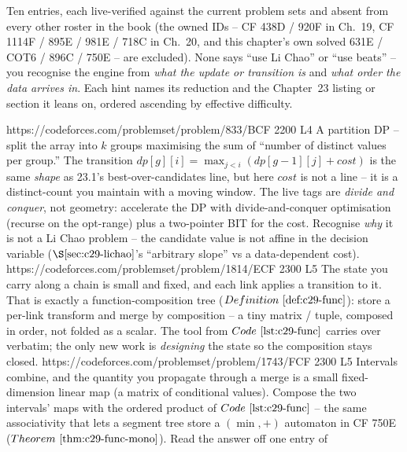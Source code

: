 
Ten entries, each live-verified against the current problem sets and absent from every other roster
in the book (the owned IDs -- CF 438D / 920F in Ch.~19, CF 1114F / 895E / 981E / 718C in Ch.~20, and
this chapter's own solved 631E / COT6 / 896C / 750E -- are excluded). None says ``use Li Chao'' or
``use beats'' -- you recognise the engine from \emph{what the update or transition is} and \emph{what
order the data arrives in}. Each hint names its reduction and the Chapter~23 listing or section it
leans on, ordered ascending by effective difficulty.

\begin{mixedset}
    {https://codeforces.com/problemset/problem/833/B}{CF 2200 L4}
    {A partition DP -- split the array into \(k\) groups maximising the sum of ``number of distinct
     values per group.'' The transition \(\mathit{dp}[g][i]=\max_{j<i}(\mathit{dp}[g{-}1][j]+\mathit{cost})\)
     is the same \emph{shape} as 23.1's best-over-candidates line, but here \(\mathit{cost}\) is not a
     line -- it is a distinct-count you maintain with a moving window. The live tags are \emph{divide
     and conquer}, not geometry: accelerate the DP with divide-and-conquer optimisation (recurse on the
     opt-range) plus a two-pointer BIT for the cost. Recognise \emph{why} it is not a Li Chao problem --
     the candidate value is not affine in the decision variable (\(\secref{c29-lichao}\)'s ``arbitrary
     slope'' vs a data-dependent cost).}
    {https://codeforces.com/problemset/problem/1814/E}{CF 2300 L5}
    {The state you carry along a chain is small and fixed, and each link applies a transition to it.
     That is exactly a function-composition tree (\(\defref{c29-func}\)): store a per-link transform
     and merge by composition -- a tiny matrix / tuple, composed in order, not folded as a scalar.
     The tool from \(\coderef{c29-func}\) carries over verbatim; the only new work is \emph{designing}
     the state so the composition stays closed.}
    {https://codeforces.com/problemset/problem/1743/F}{CF 2300 L5}
    {Intervals combine, and the quantity you propagate through a merge is a small fixed-dimension
     linear map (a matrix of conditional values). Compose the two intervals' maps with the ordered
     product of \(\coderef{c29-func}\) -- the same associativity that lets a segment tree store a
     \((\min,+)\) automaton in CF 750E (\(\thmref{c29-func-mono}\)). Read the answer off one entry of
}
\end{mixedset}
